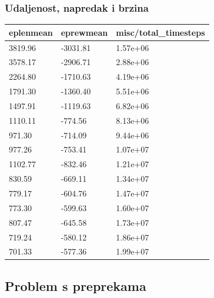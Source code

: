 \documentclass{beamer}
\begin{document}
\begin{frame}
	\frametitle{Udaljenost, napredak i brzina}

	\begin{table}[ht!]
		\centering
		\label{tab:rub}
		\begin{tabular}{@{}lll@{}}
			\hline
			eplenmean & eprewmean & misc/total\_timesteps \\
			\hline
			\hline
			3819.96   & -3031.81  & 1.57e+06              \\
			3578.17   & -2906.71  & 2.88e+06              \\
			2264.80   & -1710.63  & 4.19e+06              \\
			1791.30   & -1360.40  & 5.51e+06              \\
			1497.91   & -1119.63  & 6.82e+06              \\
			1110.11   & -774.56   & 8.13e+06              \\
			971.30    & -714.09   & 9.44e+06              \\
			977.26    & -753.41   & 1.07e+07              \\
			1102.77   & -832.46   & 1.21e+07              \\
			830.59    & -669.11   & 1.34e+07              \\
			779.17    & -604.76   & 1.47e+07              \\
			773.30    & -599.63   & 1.60e+07              \\
			807.47    & -645.58   & 1.73e+07              \\
			719.24    & -580.12   & 1.86e+07              \\
			701.33    & -577.36   & 1.99e+07              \\
			\hline
		\end{tabular}
	\end{table}

\end{frame}

\subsection{Problem s preprekama}
\end{document}
